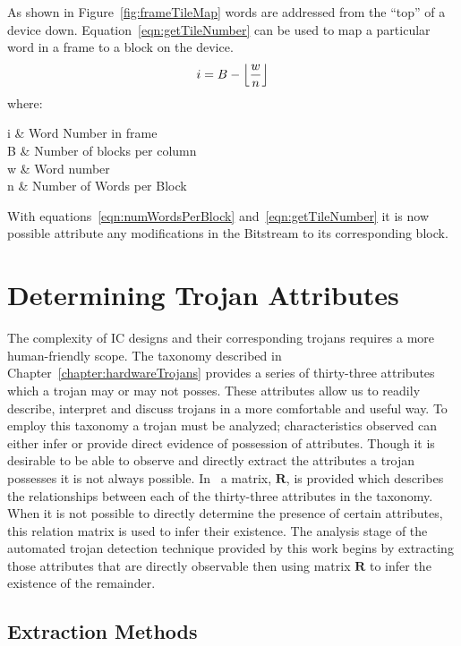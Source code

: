 \normalsize
As shown in Figure~\ref{fig:frameTileMap} words are addressed from the ``top'' of a device down.
Equation~\ref{eqn:getTileNumber} can be used to map a particular word in a frame to a block on the device.
\begin{equation} \label{eqn:getTileNumber}
i = B - \floor*{\frac{w}{n}}
\end{equation}
\ConditionSize
where:
\begin{conditions}
	i     &  Word Number in frame\\
	B     &  Number of blocks per column \\
	w     &  Word number \\
	n     &  Number of Words per Block 
\end{conditions}
\normalsize
With equations~\ref{eqn:numWordsPerBlock} and~\ref{eqn:getTileNumber} it is now possible attribute any modifications in the \gls{Bitstream} to its corresponding block.

\section{Determining Trojan Attributes} \label{sec:trojanAttributes}
The complexity of \acrlong{IC} designs and their corresponding trojans requires a more human-friendly scope.
The taxonomy described in Chapter~\ref{chapter:hardwareTrojans} provides a series of thirty-three attributes which a trojan may or may not posses.
These attributes allow us to readily describe, interpret and discuss trojans in a more comfortable and useful way.
To employ this taxonomy a trojan must be analyzed; characteristics observed can either infer or provide direct evidence of possession of attributes. 
Though it is desirable to be able to observe and directly extract the attributes a trojan possesses it is not always possible. 
In~\cite{samerAttribute} a matrix, $\mathbf{R}$, is provided which describes the relationships between each of the thirty-three attributes in the taxonomy.
When it is not possible to directly determine the presence of certain attributes, this relation matrix is used to infer their existence.
The analysis stage of the automated trojan detection technique provided by this work begins by extracting those attributes that are directly observable then using matrix $\mathbf{R}$ to infer the existence of the remainder. 
\subsection{Extraction Methods} \label{sec:directExtractionMethods}
